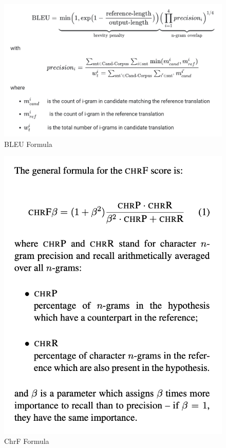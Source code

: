 \documentclass[10pt,twocolumn]{article}
\begin{document}
\begin{figure}
    \centering
    \includegraphics[width=.95\linewidth]{BLEU.png}
    \caption{
        BLEU Formula
    }
    \label{fig:first-page}
\end{figure}
\cite{GoogleBLUE}
\begin{figure}
    \centering
    \includegraphics[width=.95\linewidth]{chrF.png}
    \caption{
        ChrF Formula
    }
    \label{fig:first-page}
\end{figure}
\cite{ChrFArticle}
\end{document}
